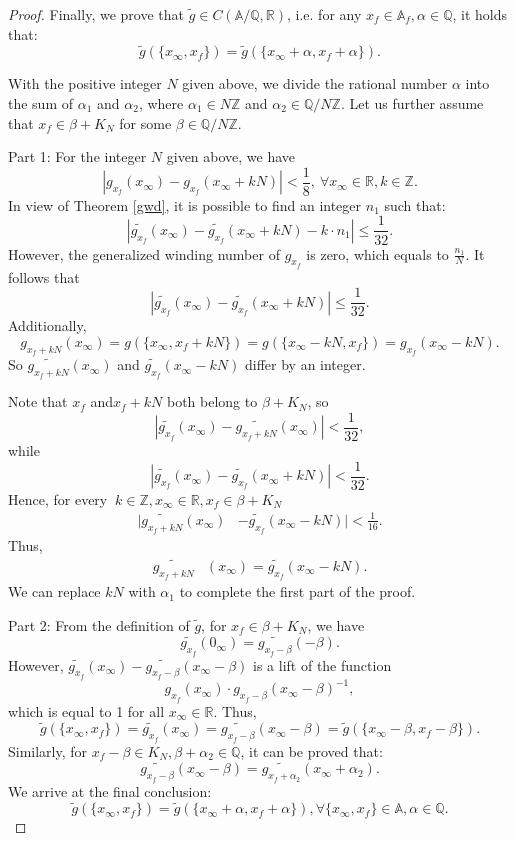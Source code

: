 \documentclass[11pt]{article}
\newcommand{\A}{\mathbb{A}}
\theoremstyle{remark}
\begin{document}
\begin{proof}
Finally, we prove that \( \widetilde{g} \in C(\A / \mathbb{Q}, \mathbb{R}) \), i.e. for any \( x_f \in \A_f, \alpha\in\mathbb{Q} \), it holds that:
\[
\widetilde{g}(\{x_\infty, x_f\}) = \widetilde{g}(\{x_\infty + \alpha, x_f + \alpha\}).
\]

With the positive integer $N$ given above, we divide the rational number $\alpha$ into the sum of $\alpha_1$ and $\alpha_2$, where \( \alpha_1 \in N\mathbb{Z} \) and \( \alpha_2 \in \mathbb{Q} /N\mathbb{Z} \). Let us further assume that $x_f\in \beta +K_N$ for some $\beta\in \mathbb{Q}/N\mathbb{Z}$.

Part 1: For the integer $N$ given above, we have
\[
|g_{x_f}(x_\infty) - g_{x_f}(x_\infty + kN)| < \frac{1}{8}, \ \forall x_\infty \in \mathbb{R}, k \in \mathbb{Z}.
\]
In view of Theorem \ref{gwd}, it is possible to find an integer $n_1$ such that:
\[
|\widetilde{g_{x_f}}(x_\infty) - \widetilde{g_{x_f}}(x_\infty + kN)-k\cdot n_1| \leq \frac{1}{32}.
\]
However, the generalized winding number of \(g_{x_f}\) is zero, which equals to $\frac{n_1}{N}.$ It follows that 
\[
|\widetilde{g_{x_f}}(x_\infty) - \widetilde{g_{x_f}}(x_\infty + kN)| \leq \frac{1}{32}.
\]
Additionally, 
\[
g_{x_f + kN}(x_\infty) = g(\{x_\infty, x_f + kN\}) = g(\{ x_\infty - kN, x_f \})=g_{x_f}(x_{\infty}-kN).
\]
So \( \widetilde{g_{x_f+kN}}(x_\infty ) \) and \( \widetilde{g_{x_f}}(x_\infty-kN) \)  differ by an integer.

Note that \(x_f\) and\( x_f+kN\) both belong to $\beta +K_N$, so \[|\widetilde{g_{x_{f}}}(x_{\infty})-\widetilde{g_{x_{f}+kN}}(x_{\infty})|<\frac{1}{32},\]while 
\[
|\widetilde{g_{x_{f}}}(x_{\infty})-\widetilde{g_{x_{f}}}(x_{\infty}+kN)|<\frac{1}{32}.
\]
Hence, for every \(\ k\in \mathbb{Z},x_{\infty}\in \mathbb{R},x_{f}\in \beta+K_N\)
\begin{align*}
    |\widetilde{g_{x_{f}+kN}}(x_{\infty})&-\widetilde{{g}_{x_{f}}}(x_{\infty}-kN)|<\frac{1}{16}.
\end{align*}
Thus,
\begin{align*}
    \widetilde{g_{x_{f}+kN}}&(x_{\infty})=\widetilde{{g}_{x_{f}}}(x_{\infty}-kN).
\end{align*}
We can replace \( kN \) with \( \alpha_1 \) to complete the first part of the proof.

Part 2: From the definition of \( \tilde{g} \),  for  \( x_f \in\beta+ K_N \), we have\[\widetilde{g_{x_f}}(0_{\infty})=\widetilde{g_{x_f-\beta}}(-\beta).\]
However, \(\widetilde{g_{x_f}}(x_{\infty})-\widetilde{g_{x_f-\beta}}(x_{\infty}-\beta)\) is a lift of the function
\[g_{x_f}(x_{\infty})\cdot g_{x_f-\beta}(x_{\infty}-\beta)^{-1},\]
which is equal to 1 for all $x_{\infty}\in \mathbb{R}$. Thus,
\[\tilde{g}(\{x_\infty, x_f\})=\widetilde{g_{x_f}}(x_{\infty})=\widetilde{g_{x_f-\beta}}(x_{\infty}-\beta)=\tilde{g}(\{x_\infty-\beta, x_f-\beta\}).\]
Similarly, for $x_f-\beta\in K_N, \beta+\alpha_2\in \mathbb{Q}$, it can be proved that:
\[
\widetilde{g_{x_f-\beta}}(x_{\infty}-\beta)=\widetilde{g_{x_f+\alpha_2}}(x_{\infty}+\alpha_2).
\]
We arrive at the final conclusion:
\[
\tilde{g}(\{x_\infty, x_f\})=\tilde{g}(\{x_\infty+\alpha, x_f+\alpha\}), \forall \{x_\infty,x_f\}\in\A, \alpha\in \mathbb{Q}.
\]
\end{proof}
\end{document}
